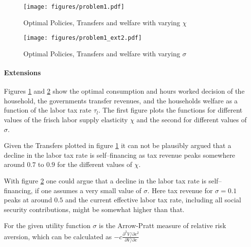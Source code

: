 \begin{figure}[h]
	\centering
			\texttt{[image: figures/problem1.pdf]}
	\caption{Optimal Policies, Transfers and welfare with varying $\chi $}
	\label{fig:problem1}
\end{figure}

\begin{figure}[h]%
\texttt{[image: figures/problem1\_ext2.pdf]}%
\caption{Optimal Policies, Transfers and welfare with varying $\sigma $}%
\label{fig:problem1_ext2}%
\end{figure}

\paragraph{Extensions}
Figures \ref{fig:problem1} and \ref{fig:problem1_ext2} show the optimal consumption and hours worked decision of the household, the governments transfer revenues, and the households welfare as a function of the labor tax rate $\tau_l$. The first figure plots the functions for different values of the frisch labor supply elasticity $\chi $ and the second for different values of $\sigma $.

Given the Transfers plotted in figure \ref{fig:problem1} it can not be plausibly argued that a decline in the labor tax rate is self--financing as tax revenue peaks somewhere around $0.7$ to $0.9$ for the different values of $\chi $.

With figure \ref{fig:problem1_ext2} one could argue that a decline in the labor tax rate is self--financing, if one assumes a very small value of $\sigma $. Here tax revenue for $\sigma = 0.1$ peaks at around $0.5$ and the current effective labor tax rate, including all social security contributions, might be somewhat higher than that.

For the given utility function $\sigma $ is the Arrow-Pratt measure of relative risk aversion, which can be calculated as $-c \frac{\partial^2 V / \partial c^2}{\partial V / \partial c} $
